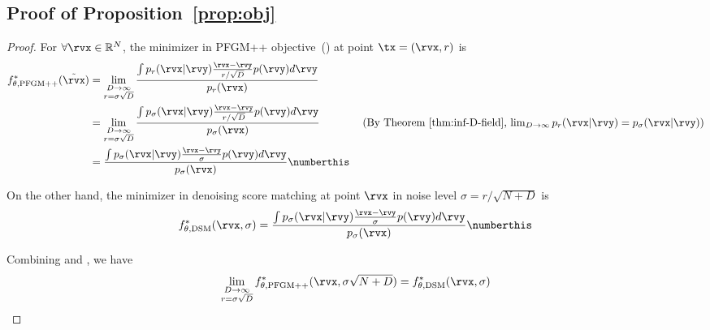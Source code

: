 \subsection{Proof of Proposition~\ref{prop:obj}}
\label{app:proof-propobj}
\propobj*
\begin{proof}
    For $\forall \rvx \in \mathbb{R}^N$, the minimizer in PFGM++ objective~() at point $\tx=(\rvx, r)$ is
\begin{align*}
    f^*_{\theta,\textrm{PFGM++}}(\tilde{\rvx}) &= \lim_{\substack{D\to \infty\\r=\sigma\sqrt{D}}}\frac{\int p_r(\rvx|{{\rvy}})\frac{{{\rvx}-{\rvy}}}{r/\sqrt{D}}p({\rvy}) d{\rvy}}{p_r(\rvx)}\\
    &= \lim_{\substack{D\to \infty\\r=\sigma\sqrt{D}}}\frac{\int p_\sigma(\rvx|{{\rvy}})\frac{{{\rvx}-{\rvy}}}{r/\sqrt{D}}p({\rvy}) d{\rvy}}{p_\sigma(\rvx)} \qquad \tag{By Theorem~\ref{thm:inf-D-field}, $\lim_{D\to \infty}p_r(\rvx|{{\rvy}})=p_\sigma(\rvx|{{\rvy}})$}\\
    &= \frac{\int p_\sigma(\rvx|{{\rvy}})\frac{{{\rvx}-{\rvy}}}{\sigma}p({\rvy}) d{\rvy}}{p_\sigma(\rvx)}\numberthis \label{eq:minimizer-pfgmpp}
\end{align*}

On the other hand, the minimizer in denoising score matching at point $\rvx$ in noise level $\sigma=r/\sqrt{N+D}$ is
\begin{align*}
    f^*_{\theta,\textrm{DSM}}({\rvx},\sigma) = \frac{\int p_\sigma(\rvx|{{\rvy}})\frac{{{\rvx}-{\rvy}}}{\sigma}p({\rvy}) d{\rvy}}{p_\sigma(\rvx)}\numberthis \label{eq:minimizer-diffusion}
\end{align*}

Combining  and , we have 
\begin{align*}
\lim_{\substack{D\to \infty\\r=\sigma\sqrt{D}}}f^*_{\theta,\textrm{PFGM++}}(\rvx, \sigma\sqrt{N+D}) =  f^*_{\theta,\textrm{DSM}}(\rvx, \sigma)
\end{align*}

\end{proof}






















